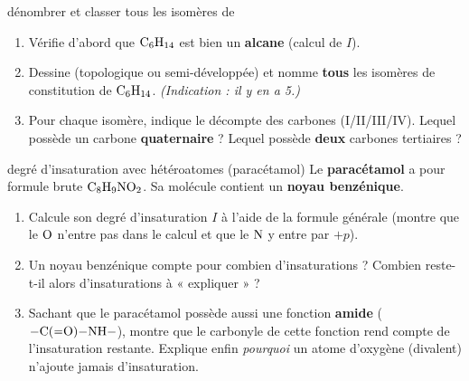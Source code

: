\documentclass[11pt,a4paper]{article}
\begin{document}
\begin{exo}{dénombrer et classer tous les isomères de }
\begin{enumerate}[label=\textbf{\alph*)},leftmargin=2em,itemsep=1pt]
  \item Vérifie d'abord que $\ce{C6H14}$ est bien un \textbf{alcane} (calcul de $I$).
  \item Dessine (topologique ou semi-développée) et nomme \textbf{tous} les isomères de constitution de $\ce{C6H14}$. \emph{(Indication : il y en a 5.)}
  \item Pour chaque isomère, indique le décompte des carbones (I/II/III/IV). Lequel possède un carbone \textbf{quaternaire} ? Lequel possède \textbf{deux} carbones tertiaires ?
\end{enumerate}
\end{exo}

\begin{exo}{degré d'insaturation avec hétéroatomes (paracétamol)}
Le \textbf{paracétamol} a pour formule brute $\ce{C8H9NO2}$. Sa molécule contient un \textbf{noyau benzénique}.
\begin{enumerate}[label=\textbf{\alph*)},leftmargin=2em,itemsep=1pt]
  \item Calcule son degré d'insaturation $I$ à l'aide de la formule générale (montre que le $\ce{O}$ n'entre pas dans le calcul et que le $\ce{N}$ y entre par $+p$).
  \item Un noyau benzénique compte pour combien d'insaturations ? Combien reste-t-il alors d'insaturations à « expliquer » ?
  \item Sachant que le paracétamol possède aussi une fonction \textbf{amide} ($\ce{-C(=O)-NH-}$), montre que le carbonyle de cette fonction rend compte de l'insaturation restante. Explique enfin \emph{pourquoi} un atome d'oxygène (divalent) n'ajoute jamais d'insaturation.
\end{enumerate}
\end{exo}
\end{document}
